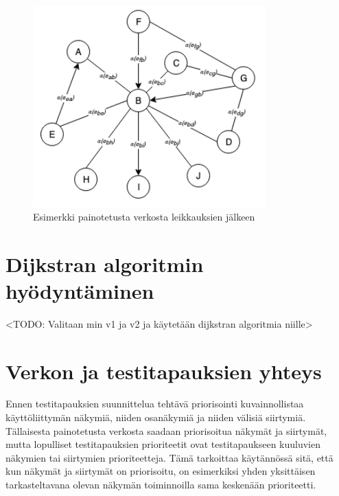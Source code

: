   \begin{figure}[H]
    \centering
    \includegraphics[width=0.8\textwidth]{assets/painotettu-verkko-jalkeen.png}
    \caption{Esimerkki painotetusta verkosta leikkauksien jälkeen}
    \label{fig:painotettu-verkko-jalkeen}
  \end{figure}

\section{Dijkstran algoritmin hyödyntäminen} \label{ch:10_dijkstran_algoritmin_hyodyntaminen}

  <TODO: Valitaan min v1 ja v2 ja käytetään dijkstran algoritmia niille>

\section{Verkon ja testitapauksien yhteys} \label{ch:10_verkon_ja_testitapauksien_yhteys}

  Ennen testitapauksien suunnittelua tehtävä priorisointi kuvainnollistaa käyttöliittymän näkymiä, niiden osanäkymiä ja niiden välisiä siirtymiä.
  Tällaisesta painotetusta verkosta saadaan priorisoitua näkymät ja siirtymät, mutta lopulliset testitapauksien prioriteetit ovat testitapaukseen kuuluvien näkymien tai siirtymien prioriteetteja.
  Tämä tarkoittaa käytännössä sitä, että kun näkymät ja siirtymät on priorisoitu, on esimerkiksi yhden yksittäisen tarkasteltavana olevan näkymän toiminnoilla sama keskenään prioriteetti.
